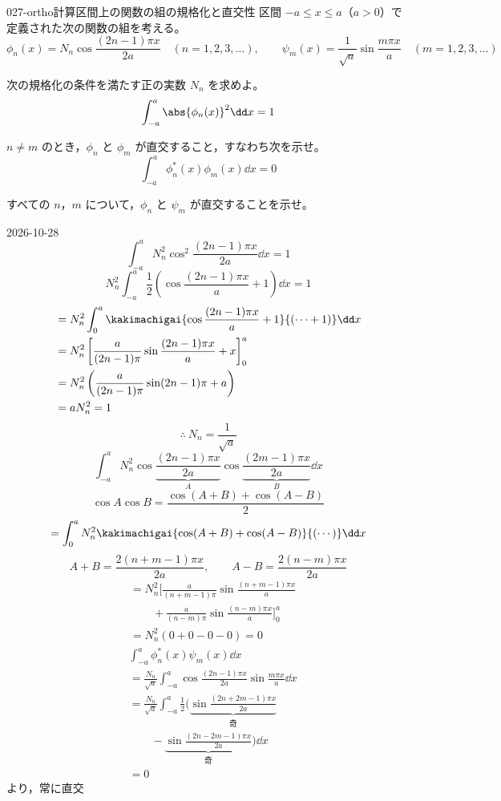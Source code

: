 \documentclass[uplatex,dvipdfmx,a4paper,11pt]{jsarticle}
\begin{document}
\begin{mondai}{027-ortho}{計算}{区間上の関数の組の規格化と直交性}
区間 $-a\le x\le a$（$a>0$）で定義された次の関数の組を考える。
  \[ \phi_{n}(x)=N_{n}\cos\frac{(2n-1)\pi x}{2a}\quad(n=1,2,3,\dots),\qquad \psi_{m}(x)=\frac{1}{\sqrt{a}}\sin\frac{m\pi x}{a}\quad(m=1,2,3,\dots) \]
  \begin{shoumon}
    \item 次の規格化の条件を満たす正の実数 $N_{n}$ を求めよ。
    \[ \int_{-a}^{a}\abs{\phi_{n}(x)}^{2}\dd x=1 \]
    \item $n\neq m$ のとき，$\phi_{n}$ と $\phi_{m}$ が直交すること，すなわち次を示せ。
    \[ \int_{-a}^{a}\phi_{n}^{*}(x)\phi_{m}(x)\dd x=0 \]
    \item すべての $n$，$m$ について，$\phi_{n}$ と $\psi_{m}$ が直交することを示せ。
  \end{shoumon}
\begin{kotaeutsushi}{2026-10-28}
\[ \int_{-a}^{a}N_{n}^{2}\cos^{2}\frac{(2n-1)\pi x}{2a}\dd x=1 \]
\[ N_{n}^{2}\int_{-a}^{a}\frac{1}{2}\left(\cos\frac{(2n-1)\pi x}{a}+1\right)\dd x=1 \]
\begin{align*}
&=N_{n}^{2}\int_{0}^{a}\kakimachigai{\cos\frac{(2n-1)\pi x}{a}+1}{(\cdots+1)}\dd x\\
&=N_{n}^{2}\left[\frac{a}{(2n-1)\pi}\sin\frac{(2n-1)\pi x}{a}+x\right]_{0}^{a}\\
&=N_{n}^{2}\left(\frac{a}{(2n-1)\pi}\sin(2n-1)\pi+a\right)\\
&=aN_{n}^{2}=1
\end{align*}
\[ \therefore\ N_{n}=\frac{1}{\sqrt{a}} \]
\[ \int_{-a}^{a}N_{n}^{2}\cos\underbrace{\frac{(2n-1)\pi x}{2a}}_{A}\cos\underbrace{\frac{(2m-1)\pi x}{2a}}_{B}\dd x \]
\[ \cos A\cos B=\frac{\cos(A+B)+\cos(A-B)}{2} \]
\[ =\int_{0}^{a}N_{n}^{2}\kakimachigai{\cos(A+B)+\cos(A-B)}{(\cdots)}\dd x \]
\[ A+B=\frac{2(n+m-1)\pi x}{2a},\qquad A-B=\frac{2(n-m)\pi x}{2a} \]
\begin{align*}
&=N_{n}^{2}\biggl[\frac{a}{(n+m-1)\pi}\sin\frac{(n+m-1)\pi x}{a}\\
&\qquad+\frac{a}{(n-m)\pi}\sin\frac{(n-m)\pi x}{a}\biggr]_{0}^{a}\\
&=N_{n}^{2}(0+0-0-0)=0
\end{align*}
\begin{align*}
&\int_{-a}^{a}\phi_{n}^{*}(x)\psi_{m}(x)\dd x\\
&=\frac{N_{n}}{\sqrt{a}}\int_{-a}^{a}\cos\frac{(2n-1)\pi x}{2a}\sin\frac{m\pi x}{a}\dd x\\
&=\frac{N_{n}}{\sqrt{a}}\int_{-a}^{a}\frac{1}{2}\biggl(\underbrace{\sin\frac{(2n+2m-1)\pi x}{2a}}_{\text{奇}}\\
&\qquad-\underbrace{\sin\frac{(2n-2m-1)\pi x}{2a}}_{\text{奇}}\biggr)\dd x\\
&=0
\end{align*}
より，常に直交
\end{kotaeutsushi}
\end{mondai}
\end{document}
